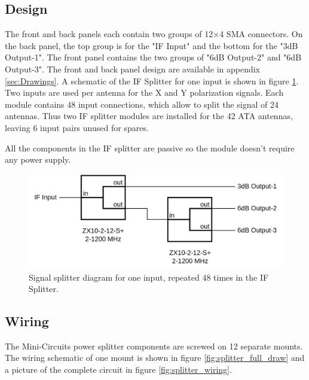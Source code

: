 \documentclass[12pt,a4paper,oneside]{article}
\begin{document}
\newpage
\subsection{Design}
\label{sec:Design}
The front and back panels each contain two groups of 12$\times$4 SMA connectors. On the back panel, the top group is for the "IF Input" and the bottom for the "3dB Output-1". The front panel contains the two groups of "6dB Output-2" and "6dB Output-3". The front and back panel design are available in appendix \ref{sec:Drawings}. A schematic of the IF Splitter for one input is shown in figure \ref{fig:IF_Splitter_Diagram}. Two inputs are used per antenna for the X and Y polarization signals. Each module contains 48 input connections, which allow to split the signal of 24 antennas. Thus two IF splitter modules are installed for the 42 ATA antennas, leaving 6 input pairs unused for spares.

All the components in the IF splitter are passive so the module doesn't require any power supply.

%
\begin{figure}[H]
\centering
\includegraphics[width=1\linewidth]{schematics/IF_splitter.drawio.png}
\caption{Signal splitter diagram for one input, repeated 48 times in the IF Splitter.}
\label{fig:IF_Splitter_Diagram}
\end{figure}
%

\subsection{Wiring}
\label{sec:Wiring}
The Mini-Circuits power splitter components are screwed on 12 separate mounts. The wiring schematic of one mount is shown in figure \ref{fig:splitter_full_draw} and a picture of the complete circuit in figure \ref{fig:splitter_wiring}.
\end{document}
